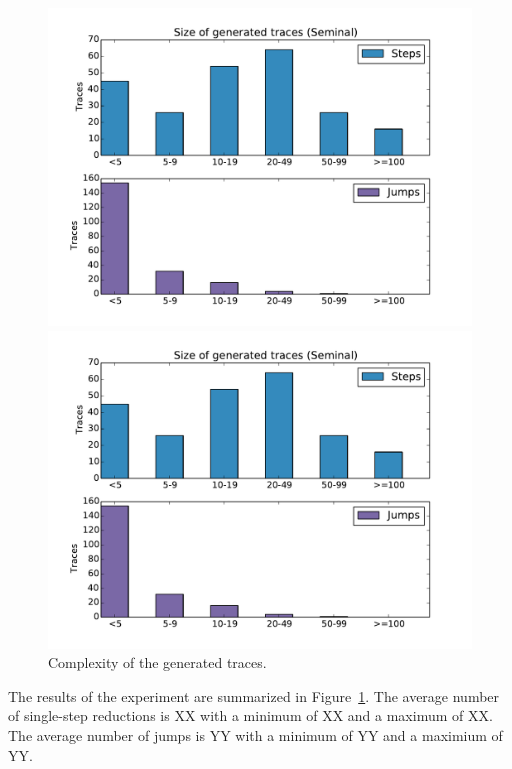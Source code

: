 \begin{figure}[t]
\centering
\begin{minipage}{0.49\linewidth}
\includegraphics[width=\linewidth]{trace_size_seminal.pdf} %
\end{minipage}
\begin{minipage}{0.49\linewidth}
\includegraphics[width=\linewidth]{trace_size_seminal.pdf}
\end{minipage}
\caption{Complexity of the generated traces.}
\label{fig:results-complexity}
\end{figure}
%
The results of the experiment are summarized in
Figure~\ref{fig:results-complexity}.
%
The average number of single-step reductions is XX with a minimum of XX
and a maximum of XX. The average number of jumps is YY with a minimum of
YY and a maximium of YY.

